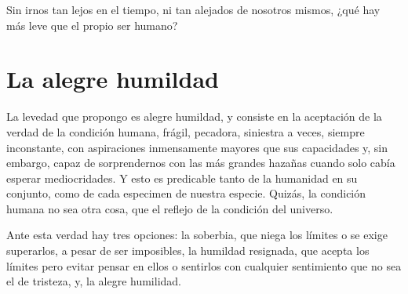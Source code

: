 Sin irnos tan lejos en el tiempo, ni tan alejados de nosotros mismos, ¿qué hay más leve que el propio ser humano? 

\section{La alegre humildad}

La levedad que propongo es alegre humildad, y consiste en la aceptación de la verdad de la condición humana, frágil, pecadora, siniestra a veces, siempre inconstante, con aspiraciones inmensamente mayores que sus capacidades y, sin embargo, capaz de sorprendernos con las más grandes hazañas cuando solo cabía esperar mediocridades. Y esto es predicable tanto de la humanidad en su conjunto, como de cada especimen de nuestra especie. Quizás, la condición humana no sea otra cosa, que el reflejo de la condición del universo.

Ante esta verdad hay tres opciones: la soberbia, que niega los límites o se exige superarlos, a pesar de ser imposibles, la humildad resignada, que acepta los límites pero evitar pensar en ellos o sentirlos con cualquier sentimiento que no sea el de tristeza, y, la alegre humilidad.

